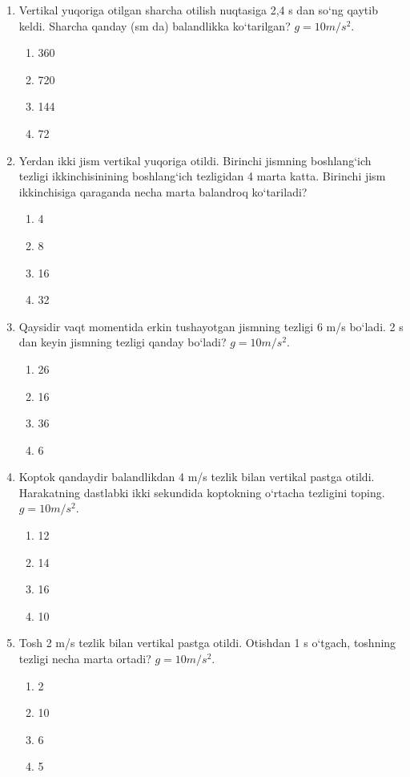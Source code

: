 \begin{enumerate}
\item Vertikal yuqoriga otilgan sharcha otilish nuqtasiga 2,4 s dan so‘ng qaytib keldi. Sharcha qanday (sm da) balandlikka ko‘tarilgan? $g=10 m/s^2$.
\begin{enumerate}[label=\Alph*)]
\item 360
\item 720
\item 144
\item 72
\end{enumerate}

\item Yerdan ikki jism vertikal yuqoriga otildi. Birinchi jismning boshlang‘ich tezligi ikkinchisinining boshlang‘ich tezligidan 4 marta katta. Birinchi jism ikkinchisiga qaraganda necha marta balandroq ko‘tariladi?
\begin{enumerate}[label=\Alph*)]
\item 4
\item 8
\item 16
\item 32
\end{enumerate}

\item Qaysidir vaqt momentida erkin tushayotgan jismning tezligi 6 m/s bo‘ladi. 2 s dan keyin jismning tezligi qanday bo‘ladi? $g=10 m/s^2$.
\begin{enumerate}[label=\Alph*)]
\item 26
\item 16
\item 36
\item 6
\end{enumerate}

\item Koptok qandaydir balandlikdan 4 m/s tezlik bilan vertikal pastga otildi. Harakatning dastlabki ikki sekundida koptokning o‘rtacha tezligini toping. $g=10 m/s^2$.
\begin{enumerate}[label=\Alph*)]
\item 12
\item 14
\item 16
\item 10
\end{enumerate}

\item Tosh 2 m/s tezlik bilan vertikal pastga otildi. Otishdan 1 s o‘tgach, toshning tezligi necha marta ortadi? $g=10 m/s^2$.
\begin{enumerate}[label=\Alph*)]
\item 2
\item 10
\item 6
\item 5
\end{enumerate}


\end{enumerate}
